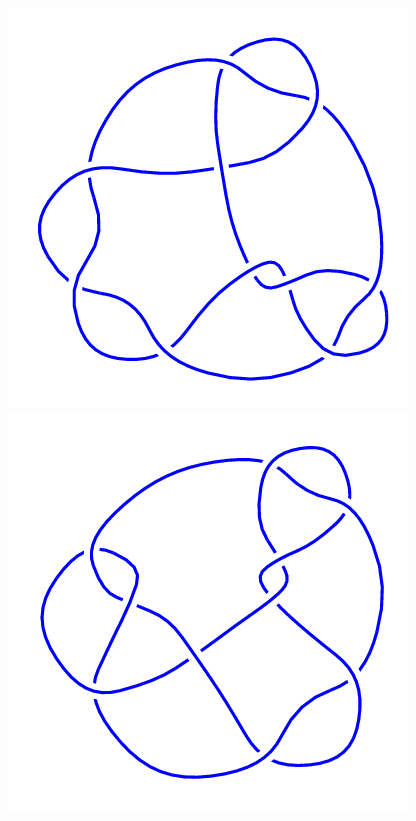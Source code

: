 \begin{figure}[H]
\begin{minipage}[b]{.18\linewidth}
	\end{minipage}
	\begin{minipage}[b]{.18\linewidth}
		\centering
		\includegraphics[width=\linewidth]{../data/10_39.png}
	\end{minipage}
	\begin{minipage}[b]{.18\linewidth}
		\centering
		\includegraphics[width=\linewidth]{../data/10_40.png}

\end{minipage}
\end{figure}
